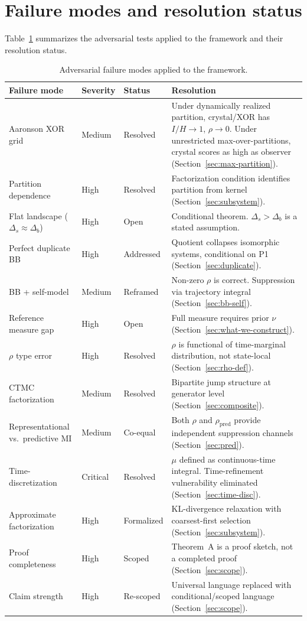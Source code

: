 \documentclass[12pt]{article}
\theoremstyle{remark}
\begin{document}
\section{Failure modes and resolution status}\label{app:kill}

Table~\ref{tab:kill} summarizes the adversarial tests applied to the framework and their resolution status.

\begin{table}[ht]
\centering
\small
\begin{tabular}{p{3.5cm}p{1.2cm}p{1.5cm}p{7cm}}
\toprule
Failure mode & Severity & Status & Resolution \\
\midrule
Aaronson XOR grid & Medium & Resolved & Under dynamically realized partition, crystal/XOR has $I/H \to 1$, $\rho \to 0$. Under unrestricted max-over-partitions, crystal scores as high as observer (Section~\ref{sec:max-partition}). \\[4pt]
Partition dependence & High & Resolved & Factorization condition identifies partition from kernel (Section~\ref{sec:subsystem}). \\[4pt]
Flat landscape ($\Delta_s \approx \Delta_b$) & High & Open & Conditional theorem. $\Delta_s > \Delta_b$ is a stated assumption. \\[4pt]
Perfect duplicate BB & High & Addressed & Quotient collapses isomorphic systems, conditional on P1 (Section~\ref{sec:duplicate}). \\[4pt]
BB + self-model & Medium & Reframed & Non-zero $\rho$ is correct. Suppression via trajectory integral (Section~\ref{sec:bb-self}). \\[4pt]
Reference measure gap & High & Open & Full measure requires prior $\nu$ (Section~\ref{sec:what-we-construct}). \\[4pt]
$\rho$ type error & High & Resolved & $\rho$ is functional of time-marginal distribution, not state-local (Section~\ref{sec:rho-def}). \\[4pt]
CTMC factorization & Medium & Resolved & Bipartite jump structure at generator level (Section~\ref{sec:composite}). \\[4pt]
Representational vs.\ predictive MI & Medium & Co-equal & Both $\rho$ and $\rho_{\mathrm{pred}}$ provide independent suppression channels (Section~\ref{sec:pred}). \\[4pt]
Time-discretization & Critical & Resolved & $\mu$ defined as continuous-time integral. Time-refinement vulnerability eliminated (Section~\ref{sec:time-disc}). \\[4pt]
Approximate factorization & High & Formalized & KL-divergence relaxation with coarsest-first selection (Section~\ref{sec:subsystem}). \\[4pt]
Proof completeness & High & Scoped & Theorem~A is a proof sketch, not a completed proof (Section~\ref{sec:scope}). \\[4pt]
Claim strength & High & Re-scoped & Universal language replaced with conditional/scoped language (Section~\ref{sec:scope}). \\
\bottomrule
\end{tabular}
\caption{Adversarial failure modes applied to the framework.}
\label{tab:kill}
\end{table}
\end{document}
